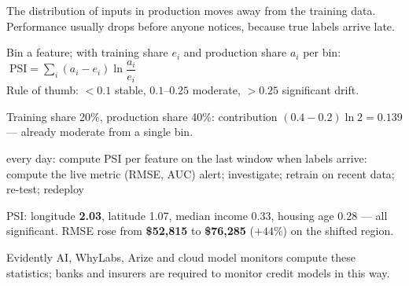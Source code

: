 \documentclass[11pt,a4paper]{article}
\begin{document}

\begin{bdef}
The distribution of inputs in production moves away from the training data. Performance usually drops before anyone notices, because true labels arrive late.
\end{bdef}
\begin{bmath}
Bin a feature; with training share $e_i$ and production share $a_i$ per bin: $\;\mathrm{PSI}=\sum_i (a_i-e_i)\ln\dfrac{a_i}{e_i}$\\[2pt]
Rule of thumb: $<0.1$ stable, $0.1$--$0.25$ moderate, $>0.25$ significant drift.
\end{bmath}
\begin{bex}
Training share 20\%, production share 40\%: contribution $(0.4-0.2)\ln 2=0.139$ --- already moderate from a single bin.
\end{bex}
\begin{balgo}
\begin{algorithmic}[1]
\State every day: compute PSI per feature on the last window
\State when labels arrive: compute the live metric (RMSE, AUC)
  \State alert; investigate; retrain on recent data; re-test; redeploy
\EndIf
\end{algorithmic}
\end{balgo}
\begin{bres}
PSI: longitude \textbf{2.03}, latitude 1.07, median income 0.33, housing age 0.28 --- all significant. RMSE rose from \textbf{\$52,815} to \textbf{\$76,285} ($+44\%$) on the shifted region.
\end{bres}
\begin{bapp}
Evidently AI, WhyLabs, Arize and cloud model monitors compute these statistics; banks and insurers are required to monitor credit models in this way.
\end{bapp}

\end{document}
